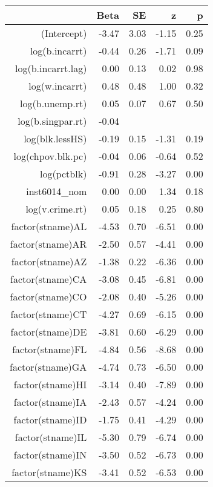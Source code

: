 \begin{table}[ht]
\centering
\begin{tabular}{rrrrr}
  \hline
 & Beta & SE & z & p \\ 
  \hline
(Intercept) & -3.47 & 3.03 & -1.15 & 0.25 \\ 
  log(b.incarrt) & -0.44 & 0.26 & -1.71 & 0.09 \\ 
  log(b.incarrt.lag) & 0.00 & 0.13 & 0.02 & 0.98 \\ 
  log(w.incarrt) & 0.48 & 0.48 & 1.00 & 0.32 \\ 
  log(b.unemp.rt) & 0.05 & 0.07 & 0.67 & 0.50 \\ 
  log(b.singpar.rt) & -0.04 &  &  &  \\ 
  log(blk.lessHS) & -0.19 & 0.15 & -1.31 & 0.19 \\ 
  log(chpov.blk.pc) & -0.04 & 0.06 & -0.64 & 0.52 \\ 
  log(pctblk) & -0.91 & 0.28 & -3.27 & 0.00 \\ 
  inst6014\_nom & 0.00 & 0.00 & 1.34 & 0.18 \\ 
  log(v.crime.rt) & 0.05 & 0.18 & 0.25 & 0.80 \\ 
  factor(stname)AL & -4.53 & 0.70 & -6.51 & 0.00 \\ 
  factor(stname)AR & -2.50 & 0.57 & -4.41 & 0.00 \\ 
  factor(stname)AZ & -1.38 & 0.22 & -6.36 & 0.00 \\ 
  factor(stname)CA & -3.08 & 0.45 & -6.81 & 0.00 \\ 
  factor(stname)CO & -2.08 & 0.40 & -5.26 & 0.00 \\ 
  factor(stname)CT & -4.27 & 0.69 & -6.15 & 0.00 \\ 
  factor(stname)DE & -3.81 & 0.60 & -6.29 & 0.00 \\ 
  factor(stname)FL & -4.84 & 0.56 & -8.68 & 0.00 \\ 
  factor(stname)GA & -4.74 & 0.73 & -6.50 & 0.00 \\ 
  factor(stname)HI & -3.14 & 0.40 & -7.89 & 0.00 \\ 
  factor(stname)IA & -2.43 & 0.57 & -4.24 & 0.00 \\ 
  factor(stname)ID & -1.75 & 0.41 & -4.29 & 0.00 \\ 
  factor(stname)IL & -5.30 & 0.79 & -6.74 & 0.00 \\ 
  factor(stname)IN & -3.50 & 0.52 & -6.73 & 0.00 \\ 
  factor(stname)KS & -3.41 & 0.52 & -6.53 & 0.00 \\ 

\end{tabular}
\end{table}
